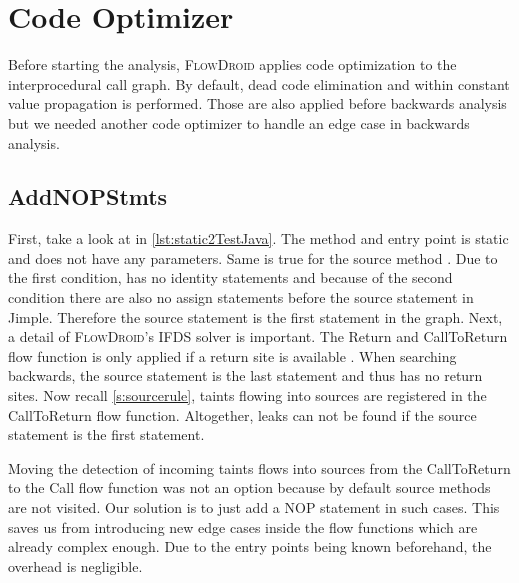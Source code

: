 \documentclass[../draft.tex]{subfiles}
\begin{document}
    \section{Code Optimizer}
    Before starting the analysis, \textsc{FlowDroid} applies code optimization to the interprocedural call graph. By default, dead code elimination and within constant value propagation is performed. Those are also applied before backwards analysis but we needed another code optimizer to handle an edge case in backwards analysis.

    \subsection{AddNOPStmts}
    First, take a look at  in \autoref{lst:static2TestJava}. The method and entry point  is static and does not have any parameters. Same is true for the source method . Due to the first condition,  has no identity statements and because of the second  condition there are also no assign statements before the source statement in Jimple. Therefore the source statement is the first statement in the graph. 
    Next, a detail of \textsc{FlowDroid}'s IFDS solver is important. The Return and CallToReturn flow function is only applied if a return site is available \cite{Arzt2017PhD}.
    When searching backwards, the source statement is the last statement and thus has no return sites. Now recall \autoref{s:sourcerule}, taints flowing into sources are registered in the CallToReturn flow function. Altogether, leaks can not be found if the source statement is the first statement.

    Moving the detection of incoming taints flows into sources from the CallToReturn to the Call flow function was not an option because by default source methods are not visited. 
    Our solution is to just add a NOP statement in such cases. This saves us from introducing new edge cases inside the flow functions which are already complex enough. Due to the entry points being known beforehand, the overhead is negligible.
\end{document}
